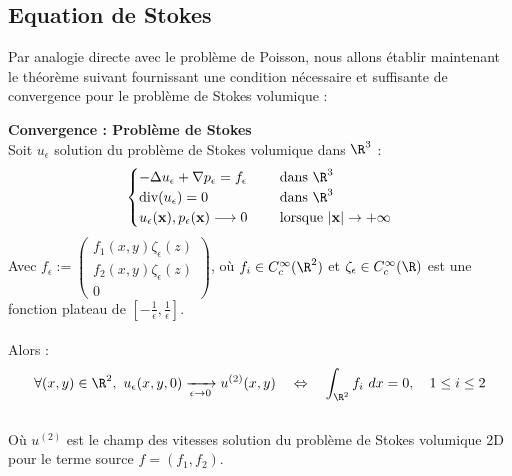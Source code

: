 \subsection{Equation de Stokes}

Par analogie directe avec le problème de Poisson, nous allons établir maintenant le théorème suivant fournissant une condition nécessaire et suffisante de convergence pour le problème de Stokes volumique :

\begin{theorembox}
    \begin{theorem}
        \textbf{Convergence : Problème de Stokes} \\
        Soit $u_{\epsilon}$ solution du problème de Stokes volumique dans $\R^3$ :
        $$\begin{cases}
            -\Delta u_{\epsilon} + \nabla p_{\epsilon} = f_{\epsilon} \quad &\text{ dans } \R^3 \\
            \text{div}(u_{\epsilon}) = 0 &\text{ dans } \R^3 \\
            u_{\epsilon}(\mathbf{x}),p_{\epsilon}(\mathbf{x}) \longrightarrow 0 &\text{ lorsque } |\mathbf{x}| \to +\infty
        \end{cases}$$
        Avec $f_{\epsilon} := 
        \begin{pmatrix}
            f_1(x,y)\zeta_{\epsilon}(z) \\
            f_2(x,y)\zeta_{\epsilon}(z) \\ 
            0
        \end{pmatrix}$, 
        où $f_i \in C^{\infty}_c(\R^2)$ et $\zeta_{\epsilon} \in C^{\infty}_c(\R)$ est une fonction plateau de $[-\frac{1}{\epsilon},\frac{1}{\epsilon}]$. \\
        \\
        Alors :
        $$\forall (x,y) \in \R^2, \ u_{\epsilon}(x,y,0) \xrightarrow[\epsilon \to 0]{} u^{(2)}(x,y) \quad \Leftrightarrow \quad \int_{\R^2} f_i \ dx = 0, \quad 1 \leq  i \leq 2 $$ 
        \\
        Où $u^{(2)}$ est le champ des vitesses solution du problème de Stokes volumique 2D pour le terme source $f = (f_1,f_2)$.
    \end{theorem}
\end{theorembox}

